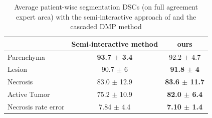 \begin{table}
\caption{Average patient-wise segmentation DSCs (on full agreement expert area) with the semi-interactive approach of \cite{Conze2017} and the cascaded DMP method}
\begin{tabular}{lcc}
\hline
& Semi-interactive method \cite{Conze2017} & ours \\
\hline
Parenchyma & \textbf{93.7 $\pm$ 3.4} & 92.2 $\pm$ 4.7 \\
Lesion & 90.7 $\pm$ 6 & \textbf{91.8 $\pm$ 4} \\
Necrosis & 83.0 $\pm$ 12.9 & \textbf{83.6 $\pm$ 11.7} \\
Active Tumor & 75.2 $\pm$ 10.9 & \textbf{82.0 $\pm$ 6.4} \\
Necrosis rate error & 7.84 $\pm$ 4.4 & \textbf{7.10 $\pm$ 1.4} \\
\hline
\end{tabular}
\label{ComparisionConze}
\end{table}

